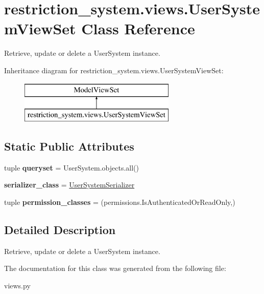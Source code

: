 \hypertarget{classrestriction__system_1_1views_1_1UserSystemViewSet}{}\section{restriction\+\_\+system.\+views.\+User\+System\+View\+Set Class Reference}
\label{classrestriction__system_1_1views_1_1UserSystemViewSet}


Retrieve, update or delete a User\+System instance.  


Inheritance diagram for restriction\+\_\+system.\+views.\+User\+System\+View\+Set\+:\begin{figure}[H]
\begin{center}
\leavevmode
\includegraphics[height=2.000000cm]{classrestriction__system_1_1views_1_1UserSystemViewSet}
\end{center}
\end{figure}
\subsection*{Static Public Attributes}
\begin{DoxyCompactItemize}
\item 
\hypertarget{classrestriction__system_1_1views_1_1UserSystemViewSet_a20b5408253f2e76183655a07a3ea8bbc}{}tuple {\bfseries queryset} = User\+System.\+objects.\+all()\label{classrestriction__system_1_1views_1_1UserSystemViewSet_a20b5408253f2e76183655a07a3ea8bbc}

\item 
\hypertarget{classrestriction__system_1_1views_1_1UserSystemViewSet_ab2d66bbe86dc21d3f39f682c8b3e8211}{}{\bfseries serializer\+\_\+class} = \hyperlink{classrestriction__system_1_1serializers_1_1UserSystemSerializer}{User\+System\+Serializer}\label{classrestriction__system_1_1views_1_1UserSystemViewSet_ab2d66bbe86dc21d3f39f682c8b3e8211}

\item 
\hypertarget{classrestriction__system_1_1views_1_1UserSystemViewSet_ad894e533f9639d80cd1389e437d22f08}{}tuple {\bfseries permission\+\_\+classes} = (permissions.\+Is\+Authenticated\+Or\+Read\+Only,)\label{classrestriction__system_1_1views_1_1UserSystemViewSet_ad894e533f9639d80cd1389e437d22f08}

\end{DoxyCompactItemize}


\subsection{Detailed Description}
Retrieve, update or delete a User\+System instance. 



The documentation for this class was generated from the following file\+:\begin{DoxyCompactItemize}
\item 
views.\+py\end{DoxyCompactItemize}
